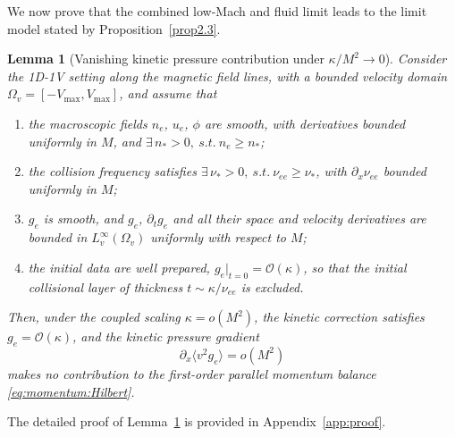 \documentclass[pdflatex,final,10pt]{article}
\newtheorem{lemma}{Lemma}[section]
\begin{document}
We now prove that the combined low-Mach and fluid limit leads to the limit model stated by Proposition~\ref{prop2.3}.


\begin{lemma}[Vanishing kinetic pressure contribution under $\kappa/M^2 \to 0$]
\label{lem:ge_estimate_1d}
Consider the 1D-1V setting along the magnetic field lines, with a bounded
velocity domain $\Omega_v = [-V_{\max}, V_{\max}]$, and assume that
\begin{enumerate}
    \item[(i)] the macroscopic fields $n_e$, $u_e$, $\phi$ are smooth, with derivatives bounded uniformly in $M$, and $\exists \,n_\ast>0,\  s.t.\ n_e\geq n_\ast$;
    \item[(ii)] the collision frequency satisfies $\exists\, \nu_\ast>0,\ s.t.\ \nu_{ee} \ge \nu_\ast$,
    with $\partial_x \nu_{ee}$ bounded uniformly in $M$;
    \item[(iii)] $g_e$ is smooth, and $g_e$, $\partial_t g_e$ and all their
    space and velocity derivatives are bounded in $L^\infty_v(\Omega_v)$
    uniformly with respect to $M$;
    \item[(iv)] the initial data are well prepared, $g_e\vert_{t=0} =
    \mathcal{O}(\kappa)$, so that the initial collisional layer of thickness
    $t \sim \kappa/\nu_{ee}$ is excluded.
\end{enumerate}
Then, under the coupled scaling $\kappa = o(M^2)$, the kinetic correction
satisfies $g_e = \mathcal{O}(\kappa)$, and the kinetic pressure gradient
\begin{equation} \label{eq:ge_bound_condensed}
    \partial_x \langle v^2 g_e \rangle = o(M^2)
\end{equation}
makes no contribution to the first-order parallel momentum balance
\eqref{eq:momentum:Hilbert}.
\end{lemma}
The detailed proof of Lemma~\ref{lem:ge_estimate_1d} is provided in Appendix~\ref{app:proof}.
\end{document}

